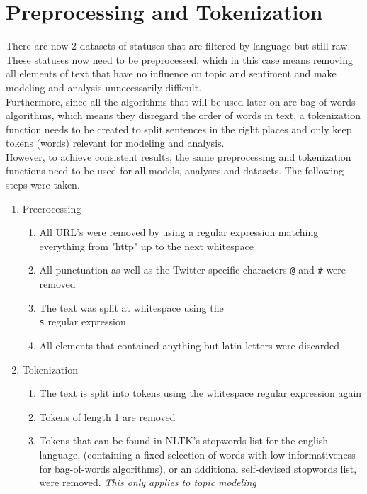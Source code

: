 \section{Preprocessing and Tokenization}
\label{sec:preprocessingAndTokenization}

There are now 2 datasets of statuses that are filtered by language but still raw.
These statuses now need to be preprocessed,
which in this case means removing all elements of text that have no influence on topic and sentiment and make
modeling and analysis unnecessarily difficult.\\
Furthermore, since all the algorithms that will be used later on are bag-of-words algorithms,
which means they disregard the order of words in text, a tokenization function needs to be created
to split sentences in the right places and only keep tokens (words) relevant for modeling and analysis.\\
However, to achieve consistent results,
the same preprocessing and tokenization functions need to be used for all models, analyses and datasets.
The following steps were taken.

\begin{enumerate}
    \item Precrocessing
    \begin{enumerate}
        \item All URL's were removed by using a regular expression matching everything from "http" up to the next whitespace
        \item All punctuation as well as the Twitter-specific characters \texttt{@} and \texttt{#} were removed
        \item The text was split at whitespace using the \texttt{\\s} regular expression
        \item All elements that contained anything but latin letters were discarded
    \end{enumerate}
    \item Tokenization
    \begin{enumerate}
        \item The text is split into tokens using the whitespace regular expression again
        \item Tokens of length 1 are removed
        \item Tokens that can be found in NLTK's stopwords list for the english language,
        (containing a fixed selection of words with low-informativeness for bag-of-words algorithms),
        or an additional self-devised stopwords list,
        were removed. \textit{This only applies to topic modeling}
    \end{enumerate}
\end{enumerate}

